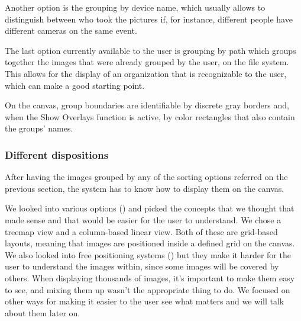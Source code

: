 Another option is the grouping by device name, which usually allows to distinguish between who took the pictures if, for instance, different people have different cameras on the same event.

The last option currently available to the user is grouping by path which groups together the images that were already grouped by the user, on the file system. This allows for the display of an organization that is recognizable to the user, which can make a good starting point.

On the canvas, group boundaries are identifiable by discrete gray borders and, when the Show Overlays function is active, by color rectangles that also contain the groups' names.


\subsubsection{Different dispositions}

After having the images grouped by any of the sorting options referred on the previous section, the system has to know how to display them on the canvas.

We looked into various options (\cite{Bederson:2001:PZI:502348.502359,Bruls:2000p3517,Chen:1998p2344,Girgensohn:2010,Heesch:2004p2675,Hsu:2009p2696,Porta:2006p416,Rodden:2001p731,Schaefer:2010p1871,Strong:2009p413}) and picked the concepts that we thought that made sense and that would be easier for the user to understand. We chose a treemap view and a column-based linear view. Both of these are grid-based layouts, meaning that images are positioned inside a defined grid on the canvas. We also looked into free positioning systems (\cite{Girgensohn:2010,Rodden:2001p731,Schaefer:2010p1871,Strong:2009p413}) but they make it harder for the user to understand the images within, since some images will be covered by others. When displaying thousands of images, it's important to make them easy to see, and mixing them up wasn't the appropriate thing to do. We focused on other ways for making it easier to the user see what matters and we will talk about them later on.

